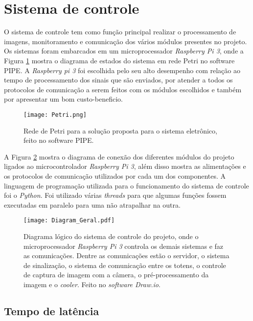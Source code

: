         
\section{Sistema de controle}

O sistema de controle tem como função principal realizar o processamento de imagens, monitoramento e comunicação dos vários módulos presentes no projeto. Os sistemas foram embarcados em um microprocessador \emph{Raspberry Pi 3}, onde a Figura \ref{redePetri} mostra o diagrama de estados do sistema em rede Petri no software PIPE. A \emph{Raspberry pi 3} foi escolhida pelo seu alto desempenho com relação ao tempo de processamento dos sinais que são enviados, por atender a todos os protocolos de comunicação a serem feitos com os módulos escolhidos e também por apresentar um bom custo-beneficio.

\begin{figure}[H]
    \centering
    \texttt{[image: Petri.png]}
    \caption{Rede de Petri para a solução proposta para o sistema eletrônico, feito no software PIPE.}
    \label{redePetri}
\end{figure}

A Figura \ref{comunicacao} mostra o diagrama de conexão dos diferentes módulos do projeto ligados ao microcontrolador \emph{Raspberry Pi 3}, além disso mostra as alimentações e os protocolos de comunicação utilizados por cada um dos componentes. A linguagem de programação utilizada para o funcionamento do sistema de controle foi o \emph{Python}. Foi utilizado várias \emph{threads} para que algumas funções fossem executadas em paralelo para uma não atrapalhar na outra.

     \begin{figure}[H]
    \centering
   \texttt{[image: Diagram\_Geral.pdf]}
   \caption{Diagrama lógico do sistema de controle do projeto, onde o microprocessador \emph{Raspberry Pi 3} controla os demais sistemas e faz as comunicações. Dentre as comunicações estão o servidor, o sistema de sinalização, o sistema de comunicação entre os totens, o controle de captura de imagem com a câmera, o pré-processamento da imagem e o \textit{cooler}. Feito no \emph{software Draw.io}.}
   \label{comunicacao}
    \end{figure}
    

\subsection{Tempo de latência}\label{tempo_latencia}


